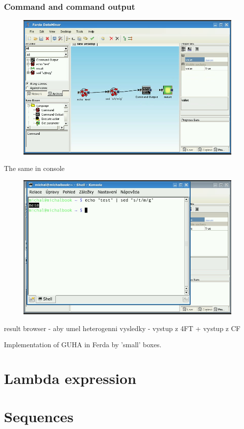 \documentclass{article}
\begin{document}
\subsubsection{Command and command output}
\begin{figure}
	\includegraphics[width=12cm]{command2.png}
	\caption{}
\end{figure}

The same in console
\begin{figure}
	\includegraphics[width=12cm]{command3.png}
	\caption{}
\end{figure}

result browser - aby umel heterogenni vysledky - vystup z 4FT + vystup z CF

Implementation of GUHA in Ferda by 'small' boxes.
\section{Lambda expression}
\section{Sequences}
\end{document}
